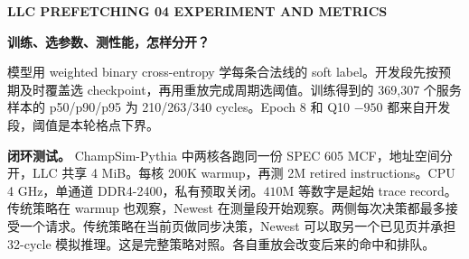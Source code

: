 \documentclass[10pt,letterpaper]{article}
\newcommand{\sectionline}[1]{{\small\bfseries\color{teal} LLC PREFETCHING \hfill #1}\par\vspace{4pt}}
\newcommand{\titleline}[1]{{\LARGE\bfseries #1}\par\vspace{6pt}}
\begin{document}
\newpage
\sectionline{04 \hfill EXPERIMENT AND METRICS}
\titleline{训练、选参数、测性能，怎样分开？}
\par
模型用 weighted binary cross-entropy 学每条合法线的 soft label。开发段先按预期及时覆盖选 checkpoint，再用重放完成周期选阈值。训练得到的 369,307 个服务样本的 p50/p90/p95 为 210/263/340 cycles。Epoch 8 和 Q10 $-950$ 都来自开发段，阈值是本轮格点下界。

\textbf{闭环测试。} ChampSim-Pythia 中两核各跑同一份 SPEC 605 MCF，地址空间分开，LLC 共享 4 MiB。每核 200K warmup，再测 2M retired instructions。CPU 4 GHz，单通道 DDR4-2400，私有预取关闭。$410$M 等数字是起始 trace record。传统策略在 warmup 也观察，Newest 在测量段开始观察。两侧每次决策都最多接受一个请求。传统策略在当前页做同步决策，Newest 可以取另一个已见页并承担 32-cycle 模拟推理。这是完整策略对照。各自重放会改变后来的命中和排队。
\end{document}
